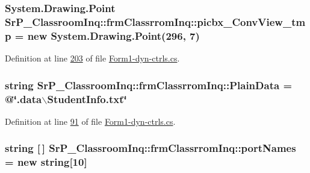 \hypertarget{class_sr_p___classroom_inq_1_1frm_classrrom_inq_ae49fd425a3c4f52d94af6c20b67f6126}{
\subsubsection[{picbx\-\_\-\-Conv\-View\-\_\-tmp}]{\setlength{\rightskip}{0pt plus 5cm}\-System.\-Drawing.\-Point {\bf \-Sr\-P\-\_\-\-Classroom\-Inq\-::frm\-Classrrom\-Inq\-::picbx\-\_\-\-Conv\-View\-\_\-tmp} = new \-System.\-Drawing.\-Point(296, 7)}}
\label{class_sr_p___classroom_inq_1_1frm_classrrom_inq_ae49fd425a3c4f52d94af6c20b67f6126}


\-Definition at line \hyperlink{_form1-dyn-ctrls_8cs_source_l00203}{203} of file \hyperlink{_form1-dyn-ctrls_8cs_source}{\-Form1-\/dyn-\/ctrls.\-cs}.

\hypertarget{class_sr_p___classroom_inq_1_1frm_classrrom_inq_a511d08cf3bdc5282be448f0513bbd262}{
\subsubsection[{\-Plain\-Data}]{\setlength{\rightskip}{0pt plus 5cm}string {\bf \-Sr\-P\-\_\-\-Classroom\-Inq\-::frm\-Classrrom\-Inq\-::\-Plain\-Data} = @\char`\"{}.data$\backslash$\-Student\-Info.\-txt\char`\"{}}}
\label{class_sr_p___classroom_inq_1_1frm_classrrom_inq_a511d08cf3bdc5282be448f0513bbd262}


\-Definition at line \hyperlink{_form1-dyn-ctrls_8cs_source_l00091}{91} of file \hyperlink{_form1-dyn-ctrls_8cs_source}{\-Form1-\/dyn-\/ctrls.\-cs}.

\hypertarget{class_sr_p___classroom_inq_1_1frm_classrrom_inq_a9c5b06a44069e68e732d7bcd7a8fa08c}{
\subsubsection[{port\-Names}]{\setlength{\rightskip}{0pt plus 5cm}string \mbox{[}$\,$\mbox{]} {\bf \-Sr\-P\-\_\-\-Classroom\-Inq\-::frm\-Classrrom\-Inq\-::port\-Names} = new string\mbox{[}10\mbox{]}}}
\label{class_sr_p___classroom_inq_1_1frm_classrrom_inq_a9c5b06a44069e68e732d7bcd7a8fa08c}


